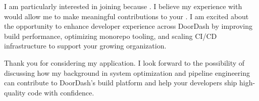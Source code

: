I am particularly interested in joining \COMPANY{} because \SPECIFICREASON. I believe my experience with \RELEVANTTECHNOLOGY{} would allow me to make meaningful contributions to your \TEAMNAME. I am excited about the opportunity to enhance developer experience across DoorDash by improving build performance, optimizing monorepo tooling, and scaling CI/CD infrastructure to support your growing organization.

Thank you for considering my application. I look forward to the possibility of discussing how my background in system optimization and pipeline engineering can contribute to DoorDash's build platform and help your developers ship high-quality code with confidence.